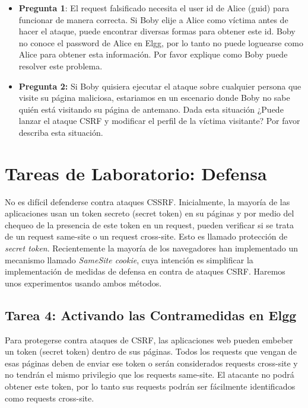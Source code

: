 \begin{itemize}
   \item \textbf{Pregunta 1}: El request falsificado necesita el user id de Alice (guid) para funcionar de manera correcta. Si Boby elije a Alice como víctima antes de hacer el ataque, puede encontrar diversas formas para obtener este id. Boby no conoce el password de Alice en Elgg, por lo tanto no puede loguearse como Alice para obtener esta información. Por favor explique como Boby puede resolver este problema.

   \item \textbf{Pregunta 2:} Si Boby quisiera ejecutar el ataque sobre cualquier persona que visite su página maliciosa, estariamos en un escenario donde Boby no sabe quién está visitando su página de antemano. Dada esta situación ¿Puede lanzar el ataque CSRF y modificar el perfil de la víctima visitante? Por favor describa esta situación.
\end{itemize}


\section{Tareas de Laboratorio: Defensa} 

No es difícil defenderse contra ataques CSSRF. Inicialmente, la mayoría de las aplicaciones usan un token secreto (secret token) en su páginas y por medio del chequeo de la presencia de este token en un request, pueden verificar si se trata de un request same-site o un request cross-site. Esto es llamado protección de  \textit{secret token}.
Recientemente la mayoría de los navegadores han implementado un mecanismo llamado  \textit{SameSite cookie}, cuya intención es simplificar la implementación de medidas de defensa en contra de ataques CSRF.
Haremos unos experimentos usando ambos métodos. 


\subsection{Tarea 4: Activando las Contramedidas en Elgg} 

Para protegerse contra ataques de CSRF, las aplicaciones web pueden embeber un token (secret token) dentro de sus páginas. Todos los requests que vengan de esas páginas deben de enviar ese token o serán considerados requests cross-site y no tendrán el mismo privilegio que los requests same-site. El atacante no podrá obtener este token, por lo tanto sus requests podrán ser fácilmente identificados como requests cross-site.

